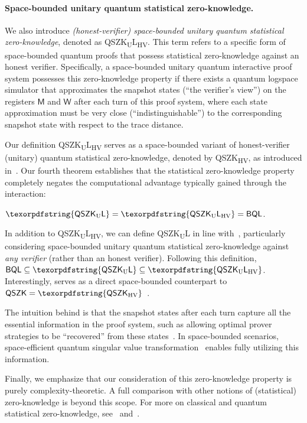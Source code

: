 \documentclass[10pt,a4paper]{article}
\numberwithin{equation}{section}
\numberwithin{figure}{section}
\newcommand{\QSZK}{\textnormal{\textsf{QSZK}}\xspace}
\newcommand{\HVQSZK}{\texorpdfstring{\textnormal{\textsf{QSZK}\textsubscript{HV}}}\xspace}
\newcommand{\QSZKUL}{\texorpdfstring{\textnormal{\textsf{QSZK}\textsubscript{\textnormal{U}}\textsf{L}}}\xspace}
\newcommand{\QSZKULHV}{\texorpdfstring{\textnormal{\textsf{QSZK}\textsubscript{\textnormal{U}}\textsf{L}}\textsubscript{\textnormal{HV}}}\xspace}
\newcommand{\BQL}{\textnormal{\textsf{BQL}}\xspace}
\newcommand{\sfM}{\mathsf{M}}
\newcommand{\sfW}{\mathsf{W}}
\begin{document}
\paragraph{Space-bounded unitary quantum statistical zero-knowledge.} We also introduce \textit{(honest-verifier) space-bounded unitary quantum statistical zero-knowledge}, denoted as \QSZKULHV{}. This term refers to a specific form of space-bounded quantum proofs that possess statistical zero-knowledge against an honest verifier. 
Specifically, a space-bounded unitary quantum interactive proof system possesses this zero-knowledge property if there exists a quantum logspace simulator that approximates the snapshot states (``the verifier's view'') on the registers $\sfM$ and $\sfW$ after each turn of this proof system, where each state approximation must be very close (``indistinguishable'') to the corresponding snapshot state with respect to the trace distance. 

Our definition \QSZKULHV{} serves as a space-bounded variant of honest-verifier (unitary) quantum statistical zero-knowledge, denoted by \HVQSZK{}, as introduced in~\cite{Wat02QSZK}. 
Our fourth theorem establishes that the statistical zero-knowledge property completely negates the computational advantage typically gained through the interaction:
\begin{theorem}
    \label{thm:QSZKL-eq-BQL-informal}
    $\QSZKUL = \QSZKULHV = \BQL$.
\end{theorem}

In addition to \QSZKULHV{}, we can define \QSZKUL{} in line with~\cite{Wat09QSZK}, particularly considering space-bounded unitary quantum statistical zero-knowledge against \textit{any verifier} (rather than an honest verifier). Following this definition, $\BQL \subseteq \QSZKUL \subseteq \QSZKULHV$. Interestingly,  serves as a direct space-bounded counterpart to $\QSZK = \HVQSZK$~\cite{Wat09QSZK}.

The intuition behind  is that the snapshot states after each turn capture all the essential information in the proof system, such as allowing optimal prover strategies to be ``recovered'' from these states~\cite[Section 7]{MY23}. In space-bounded scenarios, space-efficient quantum singular value transformation~\cite{LGLW23} enables fully utilizing this information.

Finally, we emphasize that our consideration of this zero-knowledge property is purely complexity-theoretic. A full comparison with other notions of (statistical) zero-knowledge is beyond this scope. For more on classical and quantum statistical zero-knowledge, see~\cite{Vad99} and~\cite[Chapter 5]{VW16}. 
\end{document}
